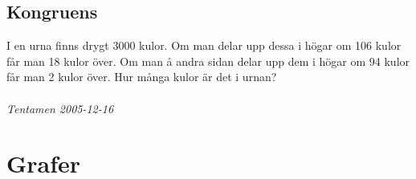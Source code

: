 \documentclass{article}
\begin{document}
\subsection*{Kongruens}
I en urna finns drygt 3000 kulor. Om man delar upp dessa i högar om 106 kulor 
får man 18 kulor över. Om man å andra sidan delar upp dem i högar om 94 kulor 
får man 2 kulor över. Hur många kulor är det i urnan?\\
\\
{\it Tentamen 2005-12-16}


\section*{Grafer}

\end{document}
